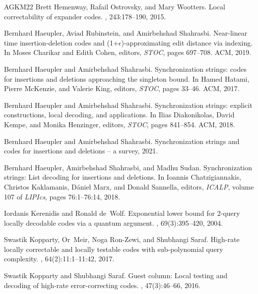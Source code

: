 \documentclass[10pt,a4paper]{article}
\theoremstyle{remark}
\begin{document}
\begin{thebibliography}{AGKM22}
Brett Hemenway, Rafail Ostrovsky, and Mary Wootters.
\newblock Local correctability of expander codes.
, 243:178--190, 2015.

Bernhard Haeupler, Aviad Rubinstein, and Amirbehshad Shahrasbi.
\newblock Near-linear time insertion-deletion codes and
  (1+\emph{{\(\epsilon\)}})-approximating edit distance via indexing.
\newblock In Moses Charikar and Edith Cohen, editors, {\em {STOC}}, pages
  697--708. {ACM}, 2019.

Bernhard Haeupler and Amirbehshad Shahrasbi.
\newblock Synchronization strings: codes for insertions and deletions
  approaching the singleton bound.
\newblock In Hamed Hatami, Pierre McKenzie, and Valerie King, editors, {\em
  {STOC}}, pages 33--46. {ACM}, 2017.

Bernhard Haeupler and Amirbehshad Shahrasbi.
\newblock Synchronization strings: explicit constructions, local decoding, and
  applications.
\newblock In Ilias Diakonikolas, David Kempe, and Monika Henzinger, editors,
  {\em {STOC}}, pages 841--854. {ACM}, 2018.

Bernhard Haeupler and Amirbehshad Shahrasbi.
\newblock Synchronization strings and codes for insertions and deletions -- a
  survey, 2021.

Bernhard Haeupler, Amirbehshad Shahrasbi, and Madhu Sudan.
\newblock Synchronization strings: List decoding for insertions and deletions.
\newblock In Ioannis Chatzigiannakis, Christos Kaklamanis, D{\'{a}}niel Marx,
  and Donald Sannella, editors, {\em {ICALP}}, volume 107 of {\em LIPIcs},
  pages 76:1--76:14, 2018.

Iordanis Kerenidis and Ronald de~Wolf.
\newblock Exponential lower bound for 2-query locally decodable codes via a
  quantum argument.
, 69(3):395--420, 2004.

Swastik Kopparty, Or~Meir, Noga Ron{-}Zewi, and Shubhangi Saraf.
\newblock High-rate locally correctable and locally testable codes with
  sub-polynomial query complexity.
, 64(2):11:1--11:42, 2017.

Swastik Kopparty and Shubhangi Saraf.
\newblock Guest column: Local testing and decoding of high-rate
  error-correcting codes.
, 47(3):46--66, 2016.


\end{thebibliography}
\end{document}

